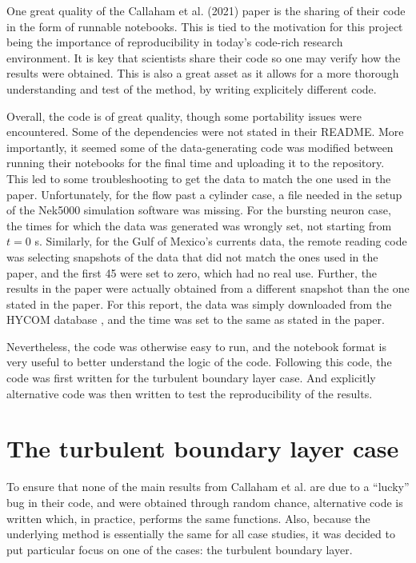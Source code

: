 \documentclass[12pt]{report} %
\begin{document}
One great quality of the Callaham et al. (2021)\cite{callaham2021learning} paper is the sharing of their code in the form of runnable notebooks. This is tied to the motivation for this project being the importance of reproducibility in today’s code-rich research environment. It is key that scientists share their code so one may verify how the results were obtained. This is also a great asset as it allows for a more thorough understanding and test of the method, by writing explicitely different code.

\vspace{5mm}

Overall, the code is of great quality, though some portability issues were encountered. Some of the dependencies were not stated in their README. More importantly, it seemed some of the data-generating code was modified between running their notebooks for the final time and uploading it to the repository. This led to some troubleshooting to get the data to match the one used in the paper. Unfortunately, for the flow past a cylinder case, a file needed in the setup of the Nek5000 simulation software was missing\cite{nek5000setup}. For the bursting neuron case, the times for which the data was generated was wrongly set, not starting from $t = 0$ s. Similarly, for the Gulf of Mexico's currents data, the remote reading code was selecting snapshots of the data that did not match the ones used in the paper, and the first 45 were set to zero, which had no real use. Further, the results in the paper were actually obtained from a different snapshot than the one stated in the paper. For this report, the data was simply downloaded from the HYCOM database \cite{hycom}, and the time was set to the same as stated in the paper.

\vspace{5mm}

Nevertheless, the code was otherwise easy to run, and the notebook format is very useful to better understand the logic of the code. Following this code, the code was first written for the turbulent boundary layer case. And explicitly alternative code was then written to test the reproducibility of the results.

\section{The turbulent boundary layer case}

To ensure that none of the main results from Callaham et al. are due to a “lucky” bug in their code, and were obtained through random chance, alternative code is written which, in practice, performs the same functions. Also, because the underlying method is essentially the same for all case studies, it was decided to put particular focus on one of the cases: the turbulent boundary layer.
\end{document}
